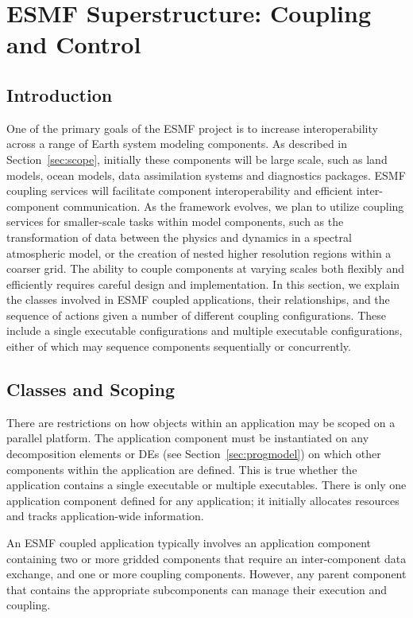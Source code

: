\section{ESMF Superstructure:  Coupling and Control}
\label{sec:superclasses}

\subsection{Introduction}

One of the primary goals of the ESMF project is to increase interoperability
across a range of Earth system modeling components.  As described in 
Section~\ref{sec:scope}, initially these 
components will be large scale, such as land models, ocean models, 
data assimilation systems and diagnostics packages.  ESMF coupling 
services will facilitate component 
interoperability and efficient inter-component communication.  As the 
framework evolves, we plan to utilize coupling services for smaller-scale 
tasks within model components, such as the transformation of data between the 
physics and dynamics in a spectral atmospheric model, or the creation 
of nested higher resolution regions within a coarser grid.  The ability to 
couple components at varying scales both flexibly and efficiently requires
careful design and implementation.  In this section, we 
explain the classes involved in ESMF coupled applications, their 
relationships, and the sequence of actions given a number of different 
coupling configurations.  These include a single executable configurations and
multiple executable configurations, either of which may sequence components
sequentially or concurrently. 

\subsection{Classes and Scoping}

There are restrictions on how objects within an application may be scoped
on a parallel platform.  The application component must be instantiated on 
any decomposition elements or DEs (see Section~\ref{sec:progmodel}) on 
which other components
within the application are defined.  This is true whether the 
application contains a single executable or multiple 
executables.  There is only one application component defined for any
application; it initially allocates resources and tracks application-wide 
information.  

An ESMF coupled application typically involves an application component 
containing two or more gridded components that require an 
inter-component data exchange, and one or more coupling 
components.  However, any parent component that contains the appropriate 
subcomponents can manage their execution and coupling.

